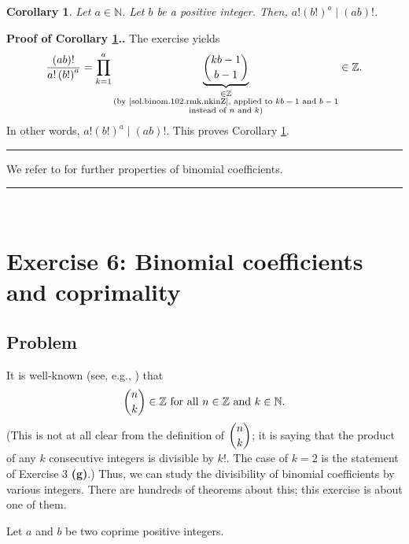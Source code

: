 \documentclass[paper=a4, fontsize=12pt]{scrartcl}%
\newcommand{\NN}{\mathbb{N}}
\newcommand{\ZZ}{\mathbb{Z}}
\newcommand{\tup}[1]{\left( #1 \right)}
\newcommand{\underbrack}[2]{\underbrace{#1}_{\substack{#2}}}
\let\prodnonlimits\prod
\renewcommand{\prod}{\prodnonlimits\limits}
\theoremstyle{plainsl}
\newtheorem{corollary}[theorem]{Corollary}
\theoremstyle{definition}
\theoremstyle{remark}
\newenvironment{proof}[1][Proof]{\noindent\textbf{#1.} }{\ \rule{0.5em}{0.5em}}
\begin{document}
\begin{corollary}
\label{cor.binom.102.rmk.div}
Let $a \in \NN$. Let $b$ be a positive integer.
Then, $a! \tup{b!}^a \mid \tup{ab}!$.
\end{corollary}

\begin{proof}[Proof of Corollary \ref{cor.binom.102.rmk.div}.]
The exercise yields
\[
\dfrac{\left(  ab \right)  !}{a! \left(  b! \right)  ^{a}}
= \prod_{k=1}^{a} \underbrack{\dbinom{kb-1}{b-1}}{\in \ZZ \\ \text{(by \eqref{sol.binom.102.rmk.nkinZ}, applied to $kb-1$ and $b-1$} \\ \text{instead of $n$ and $k$)}}
\in \ZZ .
\]
In other words, $a! \tup{b!}^a \mid \tup{ab}!$.
This proves Corollary \ref{cor.binom.102.rmk.div}.
\end{proof}

We refer to \cite[Chapter 5]{GKP} for further properties
of binomial coefficients.

\rule{\linewidth}{0.3pt} \\[0.4cm]

\section{Exercise 6: Binomial coefficients and coprimality}

\subsection{Problem}

It is well-known (see, e.g., \cite[Proposition 3.20]{detnotes}) that
\begin{equation}
\dbinom{n}{k}\in\mathbb{Z}\text{ for all }n\in\mathbb{Z}\text{ and }%
k\in\mathbb{N}. \label{eq.exe.binom.coprime-rat-cat-1.inZ}%
\end{equation}
(This is not at all clear from the definition of $\dbinom{n}{k}$; it is saying
that the product of any $k$ consecutive integers is divisible by $k!$. The
case of $k=2$ is the statement of Exercise 3 \textbf{(g)}.) Thus, we can study
the divisibility of binomial coefficients by various integers. There are
hundreds of theorems about this; this exercise is about one of them.

Let $a$ and $b$ be two coprime positive integers.
\end{document}
